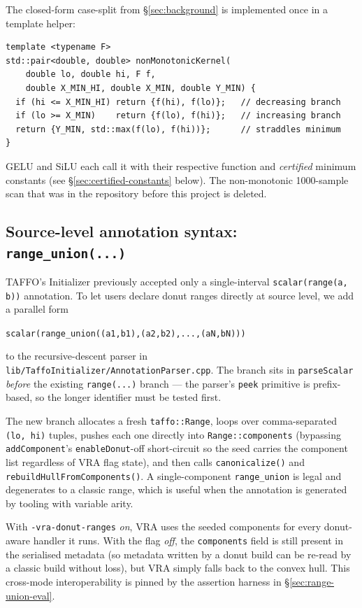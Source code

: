 \documentclass[11pt,a4paper]{article}
\theoremstyle{plain}
\begin{document}
The closed-form case-split from \S\ref{sec:background} is implemented
once in a template helper:

\begin{lstlisting}[caption={Closed-form non-monotonic activation kernel.},label={lst:nonmono}]
template <typename F>
std::pair<double, double> nonMonotonicKernel(
    double lo, double hi, F f,
    double X_MIN_HI, double X_MIN, double Y_MIN) {
  if (hi <= X_MIN_HI) return {f(hi), f(lo)};   // decreasing branch
  if (lo >= X_MIN)    return {f(lo), f(hi)};   // increasing branch
  return {Y_MIN, std::max(f(lo), f(hi))};      // straddles minimum
}
\end{lstlisting}

GELU and SiLU each call it with their respective function and
\emph{certified} minimum constants (see
\S\ref{sec:certified-constants} below). The non-monotonic 1000-sample
scan that was in the repository before this project is deleted.

\subsection{Source-level annotation syntax: \texttt{range\_union(...)}}
\label{sec:range-union-syntax}

TAFFO's Initializer previously accepted only a single-interval
\texttt{scalar(range(a, b))} annotation. To let users declare donut
ranges directly at source level, we add a parallel form
\begin{center}
\texttt{scalar(range\_union((a1,b1),(a2,b2),...,(aN,bN)))}
\end{center}
to the recursive-descent parser in
\texttt{lib/TaffoInitializer/AnnotationParser.cpp}. The branch sits in
\texttt{parseScalar} \emph{before} the existing \texttt{range(...)}
branch --- the parser's \texttt{peek} primitive is prefix-based, so the
longer identifier must be tested first.

The new branch allocates a fresh \texttt{taffo::Range}, loops over
comma-separated \texttt{(lo, hi)} tuples, pushes each one directly
into \texttt{Range::components} (bypassing \texttt{addComponent}'s
\texttt{enableDonut}-off short-circuit so the seed carries the
component list regardless of VRA flag state), and then calls
\texttt{canonicalize()} and \texttt{rebuildHullFromComponents()}. A
single-component \texttt{range\_union} is legal and degenerates to a
classic range, which is useful when the annotation is generated by
tooling with variable arity.

With \texttt{-vra-donut-ranges} \emph{on}, VRA uses the seeded
components for every donut-aware handler it runs. With the flag
\emph{off}, the \texttt{components} field is still present in the
serialised metadata (so metadata written by a donut build can be
re-read by a classic build without loss), but VRA simply falls back
to the convex hull. This cross-mode interoperability is pinned by
the assertion harness in \S\ref{sec:range-union-eval}.
\end{document}
